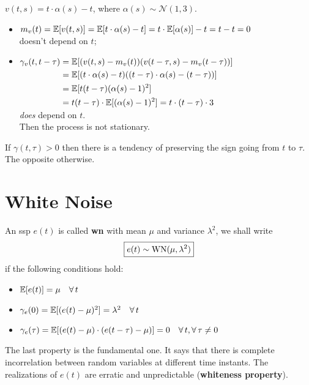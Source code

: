 \begin{exa}
$\boxed{v(t, s)=t \cdot \alpha(s)-t}$, where $\alpha(s) \sim \mathcal{N}(1,3)$.
\begin{itemize}
	\item $m_{v}(t)=\mathbb{E}[v(t, s)]=\mathbb{E}[t \cdot \alpha(s)-t]=t \cdot \mathbb{E}[\alpha(s)]-t=t-t=0$\\
	doesn't depend on $t$;
	\item $\begin{aligned}[t]
		\gamma_{v}(t, t-\tau)&=\mathbb{E}[(v(t, s)-m_{v}(t))(v(t-\tau, s)-m_{v}(t-\tau))]\\
	&=\mathbb{E}[(t \cdot \alpha(s)-t)((t-\tau) \cdot \alpha(s)-(t-\tau))]\\
	&=\mathbb{E}[t(t-\tau)(\alpha(s)-1)^{2}]\\
	&=t(t-\tau) \cdot \mathbb{E}[(\alpha(s)-1)^{2}]=t \cdot(t-\tau) \cdot 3
	\end{aligned}$\\
	\emph{does} depend on $t$.\\
	Then the process is not stationary.
\end{itemize}
\end{exa}

\begin{rem}
If $\gamma(t, \tau)>0$ then there is a tendency of preserving the sign going from $t$ to $\tau $. The opposite otherwise.
\end{rem}
\section{White Noise}

\begin{defn}
	An \gls{ssp} $e(t)$ is called \textbf{\gls{wn}} with mean $\mu$ and variance $\lambda^{2}$, we shall write
	\[
		\boxed{e(t) \sim \operatorname{WN}(\mu, \lambda^{2})}
	\]
	if the following conditions hold:
	\begin{itemize}
		\item $\E[e(t)]=\mu \quad \forall t$
		\item $\gamma_{e}(0)=\E[(e(t)-\mu)^{2}]=\lambda^{2} \quad \forall t$
		\item $\gamma_{e}(\tau)=\E[(e(t)-\mu) \cdot(e(t-\tau)-\mu)]=0 \quad \forall t, \forall \tau \neq 0$
	\end{itemize}	
\end{defn}
The last property is the fundamental one. It says that there is complete incorrelation between random variables at different time instants. The realizations of $e(t)$ are erratic and unpredictable (\textbf{whiteness property}).

